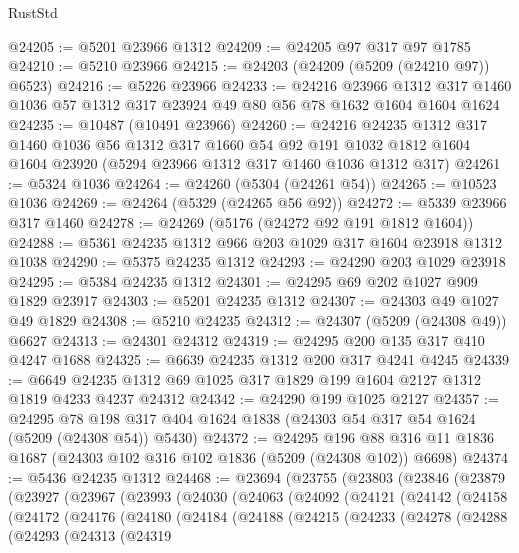 \begin{lexlean}{RustStd}
\begin{coremodule}
@24205 := @5201 @23966 @1312
@24209 := @24205 @97 @317 @97 @1785
@24210 := @5210 @23966
@24215 := @24203 (@24209 (@5209 (@24210 @97)) @6523)
@24216 := @5226 @23966
@24233 := @24216
    @23966
    @1312
    @317
    @1460
    @1036
    @57
    @1312
    @317
    @23924
    @49
    @80
    @56
    @78
    @1632
    @1604
    @1604
    @1624
@24235 := @10487 (@10491 @23966)
@24260 := @24216
    @24235
    @1312
    @317
    @1460
    @1036
    @56
    @1312
    @317
    @1660
    @54
    @92
    @191
    @1032
    @1812
    @1604
    @1604
    @23920
    (@5294 @23966 @1312 @317 @1460 @1036 @1312 @317)
@24261 := @5324 @1036
@24264 := @24260 (@5304 (@24261 @54))
@24265 := @10523 @1036
@24269 := @24264 (@5329 (@24265 @56 @92))
@24272 := @5339 @23966 @317 @1460
@24278 := @24269 (@5176 (@24272 @92 @191 @1812 @1604))
@24288 := @5361 @24235 @1312 @966 @203 @1029 @317 @1604 @23918 @1312 @1038
@24290 := @5375 @24235 @1312
@24293 := @24290 @203 @1029 @23918
@24295 := @5384 @24235 @1312
@24301 := @24295 @69 @202 @1027 @909 @1829 @23917
@24303 := @5201 @24235 @1312
@24307 := @24303 @49 @1027 @49 @1829
@24308 := @5210 @24235
@24312 := @24307 (@5209 (@24308 @49)) @6627
@24313 := @24301 @24312
@24319 := @24295 @200 @135 @317 @410 @4247 @1688
@24325 := @6639 @24235 @1312 @200 @317 @4241 @4245
@24339 := @6649 @24235 @1312 @69 @1025 @317 @1829 @199 @1604 @2127 @1312 @1819 @4233 @4237 @24312
@24342 := @24290 @199 @1025 @2127
@24357 := @24295
    @78
    @198
    @317
    @404
    @1624
    @1838
    (@24303 @54 @317 @54 @1624 (@5209 (@24308 @54)) @5430)
@24372 := @24295
    @196
    @88
    @316
    @11
    @1836
    @1687
    (@24303 @102 @316 @102 @1836 (@5209 (@24308 @102)) @6698)
@24374 := @5436 @24235 @1312
@24468 := @23694
    (@23755
      (@23803
        (@23846
          (@23879
            (@23927
              (@23967
                (@23993
                  (@24030
                    (@24063
                      (@24092
                        (@24121
                          (@24142
                            (@24158
                              (@24172
                                (@24176
                                  (@24180
                                    (@24184
                                      (@24188
                                        (@24215
                                          (@24233
                                            (@24278
                                              (@24288
                                                (@24293
                                                  (@24313
                                                    (@24319

\end{coremodule}
\end{lexlean}
